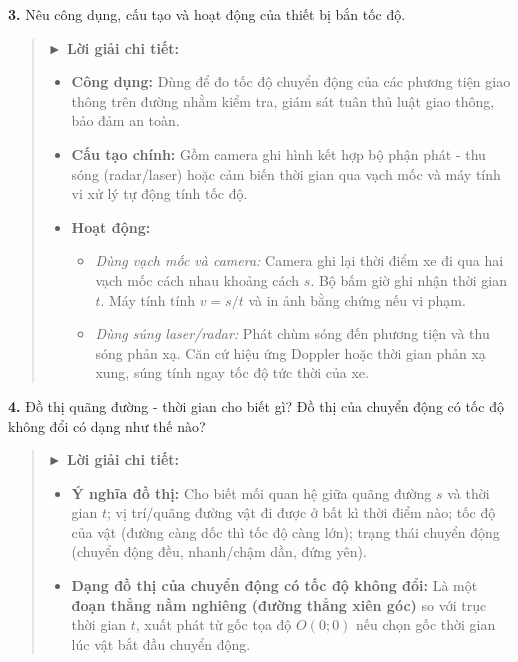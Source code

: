 \documentclass[11pt,a4paper]{article}
\begin{document}
\textbf{3.} Nêu công dụng, cấu tạo và hoạt động của thiết bị bắn tốc độ.

\begin{quote}\small
{\color{myBlue}\textbf{► Lời giải chi tiết:}}
\begin{itemize}[leftmargin=*,itemsep=1pt,topsep=1pt]
  \item \textbf{Công dụng:} Dùng để đo tốc độ chuyển động của các phương tiện giao thông trên đường nhằm kiểm tra, giám sát tuân thủ luật giao thông, bảo đảm an toàn.
  \item \textbf{Cấu tạo chính:} Gồm camera ghi hình kết hợp bộ phận phát - thu sóng (radar/laser) hoặc cảm biến thời gian qua vạch mốc và máy tính vi xử lý tự động tính tốc độ.
  \item \textbf{Hoạt động:}
    \begin{itemize}
      \item \textit{Dùng vạch mốc và camera:} Camera ghi lại thời điểm xe đi qua hai vạch mốc cách nhau khoảng cách $s$. Bộ bấm giờ ghi nhận thời gian $t$. Máy tính tính $v = s/t$ và in ảnh bằng chứng nếu vi phạm.
      \item \textit{Dùng súng laser/radar:} Phát chùm sóng đến phương tiện và thu sóng phản xạ. Căn cứ hiệu ứng Doppler hoặc thời gian phản xạ xung, súng tính ngay tốc độ tức thời của xe.
    \end{itemize}
\end{itemize}
\end{quote}

\textbf{4.} Đồ thị quãng đường - thời gian cho biết gì? Đồ thị của chuyển động có tốc độ không đổi có dạng như thế nào?

\begin{quote}\small
{\color{myBlue}\textbf{► Lời giải chi tiết:}}
\begin{itemize}[leftmargin=*,itemsep=1pt,topsep=1pt]
  \item \textbf{Ý nghĩa đồ thị:} Cho biết mối quan hệ giữa quãng đường $s$ và thời gian $t$; vị trí/quãng đường vật đi được ở bất kì thời điểm nào; tốc độ của vật (đường càng dốc thì tốc độ càng lớn); trạng thái chuyển động (chuyển động đều, nhanh/chậm dần, đứng yên).
  \item \textbf{Dạng đồ thị của chuyển động có tốc độ không đổi:} Là một \textbf{đoạn thẳng nằm nghiêng (đường thẳng xiên góc)} so với trục thời gian $t$, xuất phát từ gốc tọa độ $O(0; 0)$ nếu chọn gốc thời gian lúc vật bắt đầu chuyển động.
\end{itemize}
\end{quote}
\end{document}
